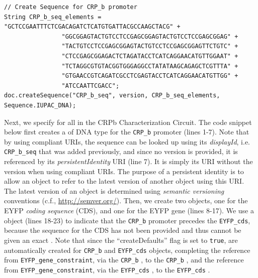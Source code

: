 \begin{minipage}{0.95\textwidth}
\begin{lstlisting}[basicstyle=\tt\footnotesize]
// Create Sequence for CRP_b promoter
String CRP_b_seq_elements =  "GCTCCGAATTTCTCGACAGATCTCATGTGATTACGCCAAGCTACG" +
                "GGCGGAGTACTGTCCTCCGAGCGGAGTACTGTCCTCCGAGCGGAG" +
                "TACTGTCCTCCGAGCGGAGTACTGTCCTCCGAGCGGAGTTCTGTC" +
                "CTCCGAGCGGAGACTCTAGATACCTCATCAGGAACATGTTGGAAT" +
                "TCTAGGCGTGTACGGTGGGAGGCCTATATAAGCAGAGCTCGTTTA" +
                "GTGAACCGTCAGATCGCCTCGAGTACCTCATCAGGAACATGTTGG" +
                "ATCCAATTCGACC";
doc.createSequence("CRP_b_seq", version, CRP_b_seq_elements, Sequence.IUPAC_DNA);
\end{lstlisting}
\end{minipage}

Next, we specify  for all  in the CRPb Characterization Circuit. The code snippet below first creates a  of DNA type for the \lstinline+CRP_b+ promoter (lines 1-7). Note that by using compliant URIs, the sequence can be looked up using its \emph{displayId}, i.e. \lstinline+CRP_b_seq+ that was added previously, and since no version is provided, it is referenced by its \emph{persistentIdentity} URI (line 7). It is simply its URI without the version when using compliant URIs. The purpose of a persistent identity is to allow an object to refer to the latest version of another object using this URI. The latest version of an object is determined using \emph{semantic versioning} conventions (c.f., \url{http://semver.org/}). Then, we create two  objects, one for the EYFP \emph{coding sequence} (CDS), and one for the EYFP gene (lines 8-17). We use a  object (lines 18-23) to indicate that the \lstinline+CRP_b+ promoter precedes the \lstinline+EYFP_cds+, because the sequence for the CDS has not been provided and thus cannot be given an exact . Note that since the ``createDefaults'' flag is set to \lstinline+true+,  are automatically created for \lstinline+CRP_b+ and \lstinline+EYFP_cds+  objects, completing the reference from \lstinline+EYFP_gene_constraint+, via the \lstinline+CRP_b+ , to the \lstinline+CRP_b+ , and the reference from \lstinline+EYFP_gene_constraint+, via the \lstinline+EYFP_cds+ , to the \lstinline+EYFP_cds+ . 

